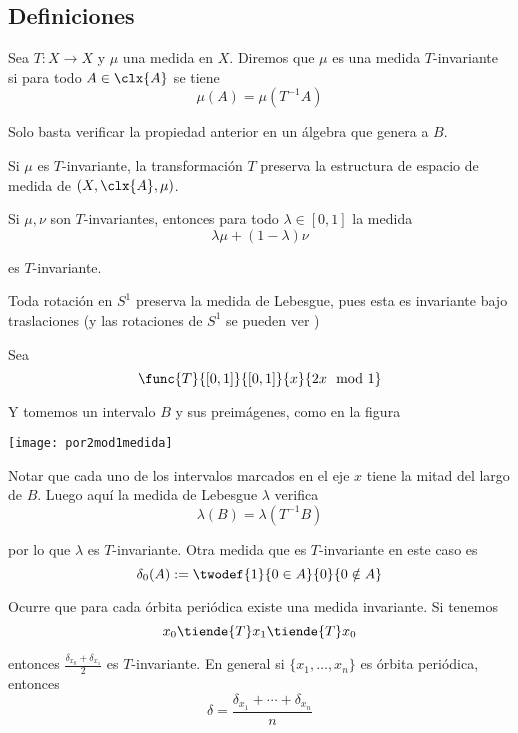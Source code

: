 \documentclass[	docname= Sistemas\ Din\'amicos,
				finished=1,
				semester=1,
				year=2017,
				professor=Godofredo\ Iommi,
				sigla=MAT2565]{apunte}
\begin{document}
\subsection{Definiciones}
\begin{defn} Sea $T: X \to X$ y $\mu$ una medida en $X$. Diremos que $\mu$ es una medida $T$-invariante si para todo $A \in \clx{A}$ se tiene
	$$\mu(A) = \mu(T^{-1}A)$$
\end{defn}

\begin{obsd} Solo basta verificar la propiedad anterior en un álgebra que genera a $B$.
\end{obsd}

\begin{obsd} Si $\mu$ es $T$-invariante, la transformación $T$ preserva la estructura de espacio de medida de $(X, \clx{A}, \mu)$.
\end{obsd}

\begin{obsd} Si $\mu, \nu$ son $T$-invariantes, entonces para todo $\lambda \in [0,1]$ la medida
	$$\lambda\mu + (1-\lambda)\nu$$

es $T$-invariante.
\end{obsd}

\begin{ex} Toda rotación en $S^{1}$ preserva la medida de Lebesgue, pues esta es invariante bajo traslaciones (y las rotaciones de $S^{1}$ se pueden ver )
\end{ex}

\begin{ex} Sea 
	$$\func{T}{[0,1]}{[0,1]}
			{x}{2x \mod 1}$$
		
Y tomemos un intervalo $B$ y sus preimágenes, como en la figura
	\begin{center}
		\texttt{[image: por2mod1medida]}
	\end{center}

Notar que cada uno de los intervalos marcados en el eje $x$ tiene la mitad del largo de $B$. Luego aquí la medida de Lebesgue $\lambda$ verifica
	$$\lambda(B) = \lambda(T^{-1}B)$$

por lo que $\lambda$ es $T$-invariante. Otra medida que es $T$-invariante en este caso es
	$$\delta_{0}(A) := \twodef{1}{0 \in A}
						{0}{0 \notin A}$$

Ocurre que para cada órbita periódica existe una medida invariante. Si tenemos
	$$x_{0} \tiende{T} x_{1} \tiende{T} x_{0}$$

entonces $\frac{\delta_{x_{0}} + \delta_{x_{1}}}{2}$ es $T$-invariante. En general si $\{x_{1}, \ldots, x_{n}\}$ es órbita periódica, entonces
	$$\delta = \frac{\delta_{x_{1}} + \cdots + \delta_{x_{n}}}{n}$$
\end{ex}
\end{document}
